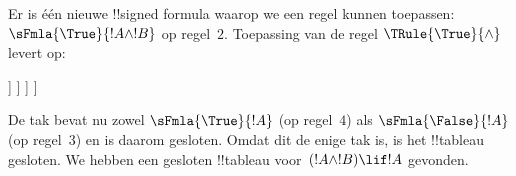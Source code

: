 \documentclass[openany]{memoir}
\begin{document}
\begin{ex}
Er is één nieuwe !!{signed formula} waarop we een regel kunnen toepassen:
$\sFmla{\True}{!A \land !B}$ op regel~$2$. Toepassing van de regel
$\TRule{\True}{\land}$ levert op:
\begin{oltableau}
  [\sFmla{\False}{(\formula{A} \land \formula{B}) \lif \formula{A}},
    checked, just = \TAss
    [\sFmla{\True}{\formula{A} \land \formula{B}},
      just={\TRule{\False}{\lif}[1]}, checked
      [\sFmla{\False}{\formula{A}}, just={\TRule{\False}{\lif}[1]}
        [\sFmla{\True}{\formula{A}}, just={\TRule{\True}{\land}[2]}
          [\sFmla{\True}{\formula{B}}, just={\TRule{\True}{\land}[2]}, close
          ]
        ]
      ]
    ]
  ]
\end{oltableau}
De tak bevat nu zowel $\sFmla{\True}{!A}$ (op regel~$4$) als
$\sFmla{\False}{!A}$ (op regel~$3$) en is daarom gesloten. Omdat dit de
enige tak is, is het !!{tableau} gesloten. We hebben een gesloten
!!{tableau} voor~$(!A \land !B) \lif !A$ gevonden.
\end{ex}
\end{document}
